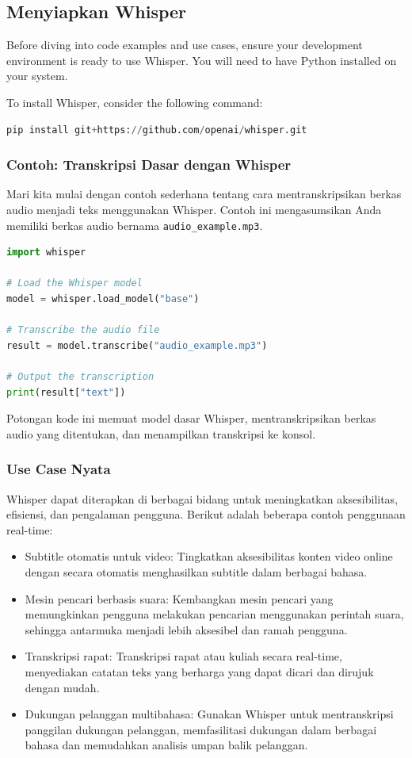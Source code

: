 \documentclass{article}
\begin{document}
\subsection{Menyiapkan Whisper}
Before diving into code examples and use cases, ensure your development environment is ready to use Whisper. You will need to have Python installed on your system.

To install Whisper, consider the following command:
\begin{lstlisting}[language=Python, caption={}, captionpos=b]
pip install git+https://github.com/openai/whisper.git
\end{lstlisting}

\subsubsection{Contoh: Transkripsi Dasar dengan Whisper}
Mari kita mulai dengan contoh sederhana tentang cara mentranskripsikan berkas audio menjadi teks menggunakan Whisper. Contoh ini mengasumsikan Anda memiliki berkas audio bernama \verb|audio_example.mp3|.
\begin{lstlisting}[language=Python, caption={}, captionpos=b]
import whisper

# Load the Whisper model
model = whisper.load_model("base")

# Transcribe the audio file
result = model.transcribe("audio_example.mp3")

# Output the transcription
print(result["text"])
\end{lstlisting}

Potongan kode ini memuat model dasar Whisper, mentranskripsikan berkas audio yang ditentukan, dan menampilkan transkripsi ke konsol.

\subsubsection{Use Case Nyata}
Whisper dapat diterapkan di berbagai bidang untuk meningkatkan aksesibilitas, efisiensi, dan pengalaman pengguna. Berikut adalah beberapa contoh penggunaan real-time:
\begin{itemize}
    \item Subtitle otomatis untuk video: Tingkatkan aksesibilitas konten video online dengan secara otomatis menghasilkan subtitle dalam berbagai bahasa.
    \item Mesin pencari berbasis suara: Kembangkan mesin pencari yang memungkinkan pengguna melakukan pencarian menggunakan perintah suara, sehingga antarmuka menjadi lebih aksesibel dan ramah pengguna.
    \item Transkripsi rapat: Transkripsi rapat atau kuliah secara real-time, menyediakan catatan teks yang berharga yang dapat dicari dan dirujuk dengan mudah.
    \item Dukungan pelanggan multibahasa: Gunakan Whisper untuk mentranskripsi panggilan dukungan pelanggan, memfasilitasi dukungan dalam berbagai bahasa dan memudahkan analisis umpan balik pelanggan.
\end{itemize}
\end{document}
